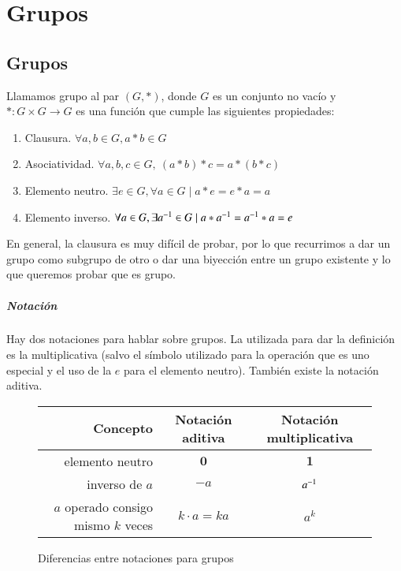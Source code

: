
\chapter{Grupos}

\section{Grupos}

\begin{dfn}[Grupo]
	Llamamos grupo al par $(G, \ast)$, donde $G$ es un conjunto no vacío y $\ast: G \times G \to G$ es una función que cumple las siguientes propiedades:
	\begin{enumerate}
		\item Clausura. $\forall a, b \in G, a \ast b \in G$
		\item Asociatividad. $\forall a, b, c \in G,\ (a \ast b) \ast c = a \ast (b \ast c)$
		\item Elemento neutro. $\exists e \in G, \forall a \in G \mid a \ast e = e \ast a = a$
		\item Elemento inverso. $\forall a \in G, \exists a^{-1} \in G \mid a \ast a^{-1} = a^{-1} \ast a = e$
	\end{enumerate}
\end{dfn}

En general, la clausura es muy difícil de probar, por lo que recurrimos a dar un grupo como subgrupo de otro o dar una biyección entre un grupo existente y lo que queremos probar que es grupo.

\paragraph{Notación}

Hay dos notaciones para hablar sobre grupos. La utilizada para dar la definición es la multiplicativa (salvo el símbolo utilizado para la operación que es uno especial y el uso de la $e$ para el elemento neutro). También existe la notación aditiva.
\begin{figure}[h]
	\centering
	{\renewcommand{\arraystretch}{1.2}
		\begin{tabular}{|r|cc|}
			\hline
			Concepto & \textbf{Notación aditiva} & \textbf{Notación multiplicativa} \\\hline
			elemento neutro & $\mathbf{0}$ & $\mathbf{1}$ \\
			inverso de $a$ & $-a$ & $a^{-1}$ \\
			$a$ operado consigo mismo $k$ veces & $k\cdot a = ka$ & $a^k$ \\\hline
			
	\end{tabular}}
	\caption{Diferencias entre notaciones para grupos}
\end{figure}


